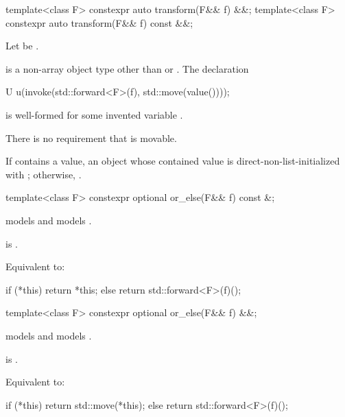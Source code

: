 \begin{itemdecl}
template<class F> constexpr auto transform(F&& f) &&;
template<class F> constexpr auto transform(F&& f) const &&;
\end{itemdecl}

\begin{itemdescr}
\pnum
Let  be
.

\pnum
\mandates
{} is a non-array object type
other than  or .
The declaration
\begin{codeblock}
U u(invoke(std::forward<F>(f), std::move(value())));
\end{codeblock}
is well-formed for some invented variable .
\begin{note}
There is no requirement that  is movable.
\end{note}

\pnum
\returns
If  contains a value, an  object
whose contained value is direct-non-list-initialized with
;
otherwise, .
\end{itemdescr}

\begin{itemdecl}
template<class F> constexpr optional or_else(F&& f) const &;
\end{itemdecl}

\begin{itemdescr}
\pnum
\constraints
{} models  and
 models .

\pnum
\mandates
{} is .

\pnum
\effects
Equivalent to:
\begin{codeblock}
if (*this) {
  return *this;
} else {
  return std::forward<F>(f)();
}
\end{codeblock}
\end{itemdescr}

\begin{itemdecl}
template<class F> constexpr optional or_else(F&& f) &&;
\end{itemdecl}

\begin{itemdescr}
\pnum
\constraints
{} models  and
 models .

\pnum
\mandates
{} is .

\pnum
\effects
Equivalent to:
\begin{codeblock}
if (*this) {
  return std::move(*this);
} else {
  return std::forward<F>(f)();
}
\end{codeblock}
\end{itemdescr}

